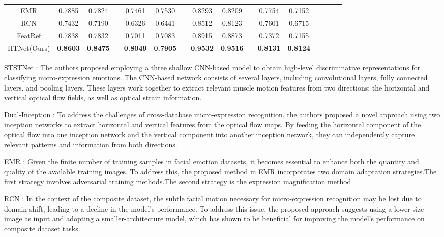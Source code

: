 \documentclass[review,12pt, 3p]{elsarticle}
\begin{document}
\begin{table*}[!t]
\begin{tabular}{c c c c c c c c c c c c c c c  c }
EMR  \cite{ref-8}              &0.7885 &0.7824  & &\underline{0.7461}& \underline{0.7530} & & 0.8293 &0.8209 & &\underline{0.7754} & 0.7152& \\
RCN  \cite{ref-6}   &0.7432 &0.7190& &0.6326 &0.6441 &  &0.8512 &0.8123 &  &0.7601 &0.6715& \\
FeatRef \cite{ref-15} &\underline{0.7838} & \underline{0.7832}  & &0.7011 & 0.7083 & & \underline{0.8915} & \underline{0.8873} & &0.7372 & \underline{0.7155}& \\
HTNet(Ours) &\textbf{0.8603} & \textbf{0.8475}  & &\textbf{0.8049} & \textbf{0.7905} & & \textbf{0.9532} & \textbf{0.9516} & &\textbf{0.8131} & \textbf{0.8124}& \\
\hline
\end{tabular}
 \label{sota-results-composite}
\end{table*}

STSTNet \cite{ref-5}: The authors proposed employing a three shallow CNN-based model to obtain high-level discriminative representations for classifying micro-expression emotions. The CNN-based network consists of several layers, including convolutional layers, fully connected layers, and pooling layers. These layers work together to extract relevant muscle motion features from two directions: the horizontal and vertical optical flow fields, as well as optical strain information. 

Dual-Inception \cite{ref-44}: To address the challenges of cross-database micro-expression recognition, the authors proposed a novel approach using two inception networks to extract horizontal and vertical features from the optical flow maps. By feeding the horizontal component of the optical flow into one inception network and the vertical component into another inception network, they can independently capture relevant patterns and information from both directions.

EMR  \cite{ref-8}: Given the finite number of training samples in facial emotion datasets, it becomes essential to enhance both the quantity and quality of the available training images. To address this, the proposed method in EMR incorporates two domain adaptation strategies.The first strategy involves adversarial training methods.The second strategy is the expression magnification method

RCN  \cite{ref-6}: In the context of the composite dataset, the subtle facial motion necessary for micro-expression recognition may be lost due to domain shift, leading to a decline in the model's performance. To address this issue, the proposed approach suggests using a lower-size image as input and adopting a smaller-architecture model, which has shown to be beneficial for improving the model's performance on composite dataset tasks.
\end{document}
